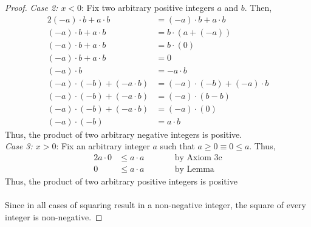 \documentclass{article}
\begin{document}
\begin{itemize}
\begin{proof}
                    \emph{Case 2: $x < 0$}: Fix two arbitrary positive integers $a$ and $b$. Then, 
                    \begin{alignat*}{2}
                        (\minus a)\cdot b + a\cdot b &= (\minus a)\cdot b + a\cdot b \\
                        (\minus a)\cdot b + a\cdot b &= b\cdot (a + (\minus a)) \\
                        (\minus a)\cdot b + a\cdot b &= b\cdot (0) \\
                        (\minus a)\cdot b + a\cdot b &= 0 \\
                        (\minus a)\cdot b &= \minus a\cdot b \\
                        (\minus a)\cdot (\minus b) + (\minus a\cdot b) &= (\minus a)\cdot (\minus b) + (\minus a)\cdot b \\
                        (\minus a)\cdot (\minus b) + (\minus a\cdot b) &= (\minus a)\cdot (b - b) \\
                        (\minus a)\cdot (\minus b) + (\minus a\cdot b) &= (\minus a)\cdot (0) \\
                        (\minus a)\cdot (\minus b) &= a\cdot b
                    \end{alignat*}
                    Thus, the product of two arbitrary negative integers is positive. \\

                    \emph{Case 3: $x > 0$}: Fix an arbitrary integer $a$ such that $a \ge 0 \equiv 0 \le a$. Thus,
                    \begin{alignat*}{2}
                        a \cdot 0 &\le a \cdot a        &\qquad &\textrm{by Axiom 3c}   \\
                        0 &\le a \cdot a                &\qquad &\textrm{by Lemma}
                    \end{alignat*}
                    Thus, the product of two arbitrary positive integers is positive \\\\
                    Since in all cases of squaring result in a non-negative integer, the square of every integer is non-negative.
            \end{proof}
    \end{itemize}
    
\end{document}
